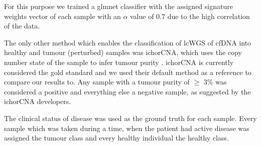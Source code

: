 For this purpose we trained a glmnet classifier with the assigned signature weights vector of each sample with an $\alpha$ value of 0.7 due to the high correlation of the data.

The only other method which enables the classification of lcWGS of cfDNA into healthy and tumour (perturbed) samples was ichorCNA, which uses the copy number state of the sample to infer tumour purity  \cite{Adalsteinsson2017}. ichorCNA is currently considered the gold standard and we used their default method as a reference to compare our results to. Any sample with a tumour purity of $\geq$ 3\% was considered a positive and everything else a negative sample, as suggested by the ichorCNA developers.

The clinical status of disease was used as the ground truth for each sample. Every sample which was taken during a time, when the patient had active disease was assigned the tumour class and every healthy individual the healthy class.
